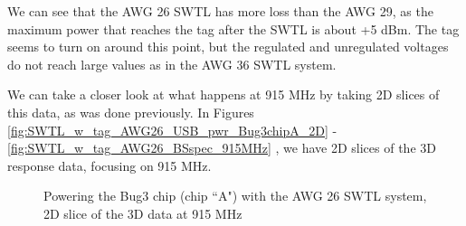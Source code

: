 \documentclass[12pt,onecolumn,titlepage]{article}
\begin{document}
We can see that the AWG 26 SWTL has more loss than the AWG 29, as the maximum power that reaches the tag after the SWTL is about +5 dBm. The tag seems to turn on around this point, but the regulated and unregulated voltages do not reach large values as in the AWG 36 SWTL system. 

We can take a closer look at what happens at 915 MHz by taking 2D slices of this data, as was done previously. In Figures \ref{fig:SWTL_w_tag_AWG26_USB_pwr_Bug3chipA_2D} - \ref{fig:SWTL_w_tag_AWG26_BSspec_915MHz} , we have 2D slices of the 3D response data, focusing on 915 MHz. 



\begin{figure}[htbp]
	\centering
		\quad
		
	\label{fig:SWTL_w_tag_AWG26_2D}
	\caption{Powering the Bug3 chip (chip ``A") with the AWG 26 SWTL system, 2D slice of the 3D data at 915 MHz }
\end{figure}
\end{document}
